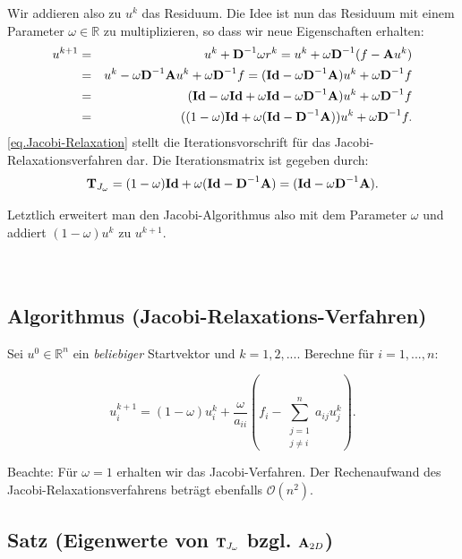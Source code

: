 Wir addieren also zu $u^{k}$ das Residuum. Die Idee ist nun das Residuum mit einem Parameter $\omega \in \mathbb{R}$ zu multiplizieren, so dass wir neue Eigenschaften erhalten:
\begin{eqnarray}
u^{k+1} &=& u^{k} + {\textbf{D}}^{-1} \omega r^{k} = u^{k} + \omega {\textbf{D}}^{-1} (f - {\textbf{A}}u^{k}) \notag \\
&=& u^{k} - \omega {\textbf{D}}^{-1} {\textbf{A}}u^{k} + \omega {\textbf{D}}^{-1}f = ({\textbf{Id}} - \omega {\textbf{D}}^{-1} {\textbf{A}})u^{k} + \omega {\textbf{D}}^{-1}f \notag \\
&=& ({\textbf{Id}} - \omega {\textbf{Id}} + \omega {\textbf{Id}} - \omega {\textbf{D}}^{-1} {\textbf{A}})u^{k} + \omega {\textbf{D}}^{-1}f \notag \\
&=& ((1 - \omega){\textbf{Id}} + \omega({\textbf{Id}} - {\textbf{D}}^{-1}{\textbf{A}})) u^{k} + \omega {\textbf{D}}^{-1}f.\label{eq.Jacobi-Relaxation}
\end{eqnarray}
\autoref{eq.Jacobi-Relaxation} stellt die Iterationsvorschrift für das Jacobi-Relaxationsverfahren dar. Die Iterationsmatrix ist gegeben durch:
\begin{equation}
{\textbf{T}}_{J_{\omega}} = (1 - \omega) {\textbf{Id}} + \omega({\textbf{Id}} - {\textbf{D}}^{-1} {\textbf{A}}) = ({\textbf{Id}} - \omega {\textbf{D}}^{-1} {\textbf{A}}).
\end{equation}

Letztlich erweitert man den Jacobi-Algorithmus also mit dem Parameter $\omega$ und addiert $(1 - \omega)u^{k}$ zu $u^{k+1}$.
\\\\\\
\subsection{Algorithmus (Jacobi-Relaxations-Verfahren)}\label{ss.Algorithmus Jacobi Relax}

Sei $u^{0} \in \mathbb{R}^{n}$ ein \textit{beliebiger} Startvektor und $k=1,2,...$. Berechne für $i=1,...,n$:

\begin{equation}
u^{k+1}_{i} = (1 - \omega)u^{k}_{i} + \frac {\omega} {a_{ii}} (f_{i} - \sum_{\substack{j = 1 \\ j \ne i}}^{n} a_{ij}u^{k}_{j}).
\end{equation}

Beachte: Für $\omega = 1$ erhalten wir das Jacobi-Verfahren. Der Rechenaufwand des Jacobi-Relaxationsverfahrens beträgt ebenfalls $\mathcal{O}(n^{2})$.

\subsection{Satz (Eigenwerte von ${\textbf{T}}_{J_{\omega}}$ bzgl. ${\textbf{A}}_{2D}$)}\label{ss.EW Relax}

